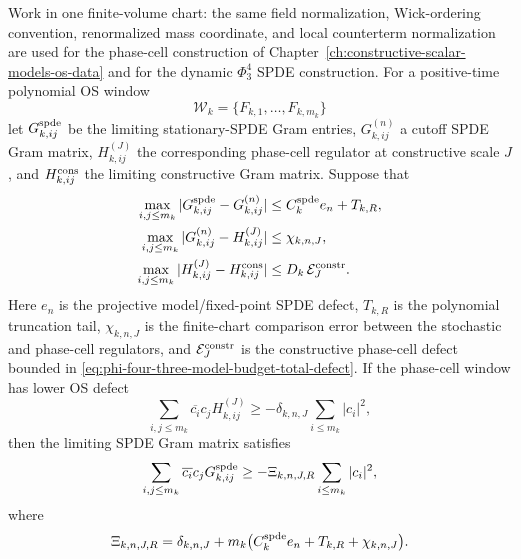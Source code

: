 \begin{proposition}
\label{prop:spde-constructive-phase-cell-cross-route-budget}
Work in one finite-volume chart: the same field normalization, Wick-ordering
convention, renormalized mass coordinate, and local counterterm normalization
are used for the phase-cell construction of
Chapter~\ref{ch:constructive-scalar-models-os-data} and for the dynamic
\(\Phi^4_3\) SPDE construction.  For a positive-time polynomial OS window
\[
  \mathcal W_k=\{F_{k,1},\ldots,F_{k,m_k}\}
\]
let \(G_{k,ij}^{\rm spde}\) be the limiting stationary-SPDE Gram entries,
\(G_{k,ij}^{(n)}\) a cutoff SPDE Gram matrix, \(H_{k,ij}^{(J)}\) the
corresponding phase-cell regulator at constructive scale \(J\), and
\(H_{k,ij}^{\rm cons}\) the limiting constructive Gram matrix.  Suppose that
\begin{align}
  \max_{i,j\leq m_k}
  |G_{k,ij}^{\rm spde}-G_{k,ij}^{(n)}|
  &\leq C_k^{\rm spde} e_n+T_{k,R},
  \label{eq:spde-cross-route-spde-entrywise}\\
  \max_{i,j\leq m_k}
  |G_{k,ij}^{(n)}-H_{k,ij}^{(J)}|
  &\leq \chi_{k,n,J},
  \label{eq:spde-cross-route-finite-chart}\\
  \max_{i,j\leq m_k}
  |H_{k,ij}^{(J)}-H_{k,ij}^{\rm cons}|
  &\leq D_k\,\mathcal E_J^{\rm constr}.
  \label{eq:spde-cross-route-constructive-tail}
\end{align}
Here \(e_n\) is the projective model/fixed-point SPDE defect, \(T_{k,R}\) is
the polynomial truncation tail, \(\chi_{k,n,J}\) is the finite-chart
comparison error between the stochastic and phase-cell regulators, and
\(\mathcal E_J^{\rm constr}\) is the constructive phase-cell defect bounded in
\eqref{eq:phi-four-three-model-budget-total-defect}.  If the phase-cell
window has lower OS defect
\begin{equation}
  \sum_{i,j\leq m_k}\overline{c_i}c_jH_{k,ij}^{(J)}
  \geq
  -\delta_{k,n,J}\sum_{i\leq m_k}|c_i|^2,
  \label{eq:spde-cross-route-phase-cell-os-defect}
\end{equation}
then the limiting SPDE Gram matrix satisfies
\begin{equation}
  \sum_{i,j\leq m_k}\overline{c_i}c_jG_{k,ij}^{\rm spde}
  \geq
  -\Xi_{k,n,J,R}\sum_{i\leq m_k}|c_i|^2,
  \label{eq:spde-cross-route-spde-os-defect}
\end{equation}
where
\begin{equation}
  \Xi_{k,n,J,R}
  =
  \delta_{k,n,J}
  +m_k\bigl(C_k^{\rm spde} e_n+T_{k,R}+\chi_{k,n,J}\bigr).
  \label{eq:spde-cross-route-spde-defect}

\end{equation}
\end{proposition}
